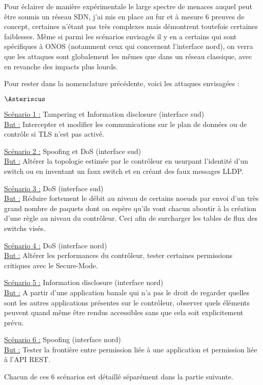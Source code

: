 Pour éclairer de manière expérimentale le large spectre de menaces auquel peut être soumis un réseau SDN, j'ai mis en place au fur et à mesure 6 preuves de concept, certaines n'étant pas très complexes mais démontrent toutefois certaines faiblesses. Même si parmi les scénarios envisagés il y en a certains qui sont spécifiques à ONOS (notamment ceux qui concernent l'interface nord), on verra que les attaques sont globalement les mêmes que dans un réseau classique, avec en revanche des impacts plus lourds.

Pour rester dans la nomenclature précédente, voici les attaques envisagées :

\begin{list}{$\Asteriscus$}{}

\item \underline{Scénario 1 :} Tampering et Information disclosure (interface sud) \\
\underline{But :} Intercepter et modifier les communications sur le plan de données ou de contrôle si TLS n'est pas activé.

\item \underline{Scénario 2 :} Spoofing et DoS (interface sud) \\
\underline{But :} Altérer la topologie estimée par le contrôleur en usurpant l'identité d'un switch ou en inventant un faux switch et en créant des faux messages LLDP.

\item \underline{Scénario 3 :} DoS (interface sud) \\
\underline{But :} Réduire fortement le débit au niveau de certains noeuds par envoi d'un très grand nombre de paquets dont on espère qu'ils vont chacun aboutir à la création d'une règle au niveau du contrôleur. Ceci afin de surcharger les tables de flux des switchs visés.

\item \underline{Scénario 4 :} DoS (interface nord) \\
\underline{But :} Altérer les performances du contrôleur, tester certaines permissions critiques avec le Secure-Mode.

\item \underline{Scénario 5 :} Information disclosure (interface nord) \\
\underline{But :} A partir d'une application banale qui n'a pas le droit de regarder quelles sont les autres applications présentes sur le contrôleur, observer quels éléments peuvent quand même être rendus accessibles sans que cela soit explicitement prévu.

\item \underline{Scénario 6 :} Spoofing (interface nord) \\
\underline{But :} Tester la frontière entre permission liée à une application et permission liée à l'API REST.

\end{list}

Chacun de ces 6 scénarios est détaillé séparément dans la partie suivante.